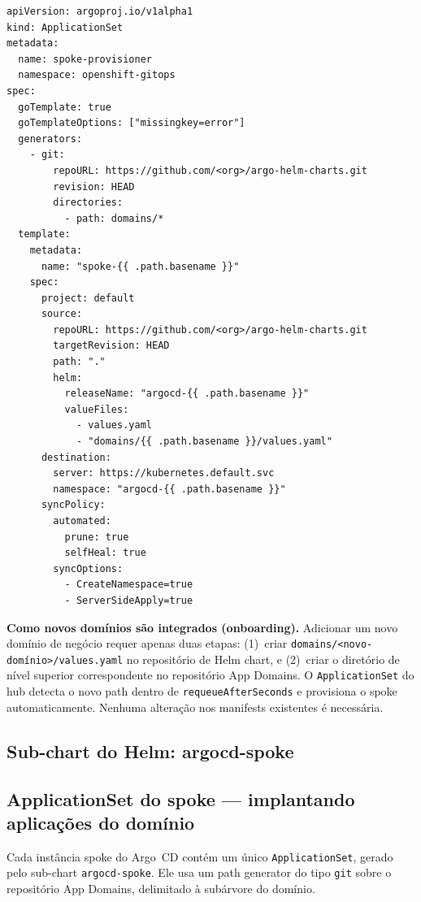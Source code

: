 \documentclass[11pt,a4paper]{article}
\begin{document}
\begin{lstlisting}[style=yaml,
  caption={ApplicationSet do hub: path generator sobre o repositório de Helm chart},
  label={lst:hub-appset}]
apiVersion: argoproj.io/v1alpha1
kind: ApplicationSet
metadata:
  name: spoke-provisioner
  namespace: openshift-gitops
spec:
  goTemplate: true
  goTemplateOptions: ["missingkey=error"]
  generators:
    - git:
        repoURL: https://github.com/<org>/argo-helm-charts.git
        revision: HEAD
        directories:
          - path: domains/*
  template:
    metadata:
      name: "spoke-{{ .path.basename }}"
    spec:
      project: default
      source:
        repoURL: https://github.com/<org>/argo-helm-charts.git
        targetRevision: HEAD
        path: "."
        helm:
          releaseName: "argocd-{{ .path.basename }}"
          valueFiles:
            - values.yaml
            - "domains/{{ .path.basename }}/values.yaml"
      destination:
        server: https://kubernetes.default.svc
        namespace: "argocd-{{ .path.basename }}"
      syncPolicy:
        automated:
          prune: true
          selfHeal: true
        syncOptions:
          - CreateNamespace=true
          - ServerSideApply=true
\end{lstlisting}

\begin{infobox}
  \textbf{Como novos domínios são integrados (onboarding).}
  Adicionar um novo domínio de negócio requer apenas duas etapas: (1)~criar
  \texttt{domains/<novo-domínio>/values.yaml} no repositório de Helm chart, e
  (2)~criar o diretório de nível superior correspondente no repositório App Domains.
  O \texttt{ApplicationSet} do hub detecta o novo path dentro de
  \texttt{requeueAfterSeconds} e provisiona o spoke automaticamente.
  Nenhuma alteração nos manifests existentes é necessária.
\end{infobox}

\subsection{Sub-chart do Helm: argocd-spoke}


\subsection{ApplicationSet do spoke --- implantando aplicações do domínio}

Cada instância spoke do Argo~CD contém um único \texttt{ApplicationSet}, gerado pelo
sub-chart \texttt{argocd-spoke}.
Ele usa um path generator do tipo \texttt{git} sobre o repositório App Domains,
delimitado à subárvore do domínio.
\end{document}
